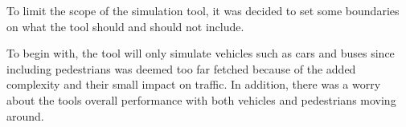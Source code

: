 
To limit the scope of the simulation tool, it was decided to set some boundaries on what the tool should and should not include. 

To begin with, the tool will only simulate vehicles such as cars and buses since including pedestrians was deemed too far fetched because of the added complexity and their small impact on traffic. In addition, there was a worry about the tools overall performance with both vehicles and pedestrians moving around.

